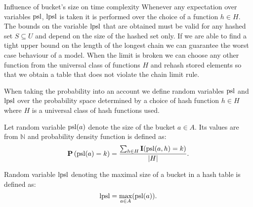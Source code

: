 \begin{section}{Influence of bucket's size on time complexity}
Whenever any expectation over variables $\mathrm{psl}$, $\mathrm{lpsl}$ is taken it is performed over the choice of a function $h \in H$. The bounds on the variable $\mathrm{lpsl}$ that are obtained must be valid for any hashed set $S \subseteq U$ and depend on the size of the hashed set only. If we are able to find a tight upper bound on the length of the longest chain we can guarantee the worst case behaviour of a model. When the limit is broken we can choose any other function from the universal class of functions $H$ and rehash stored elements so that we obtain a table that does not violate the chain limit rule.

When taking the probability into an account we define random variables $\mathrm{psl}$ and $\mathrm{lpsl}$ over the probability space determined by a choice of hash function $h \in H$ where $H$ is a universal class of hash functions used.

\begin{definition}
Let random variable $\mathrm{psl}(a)$ denote the size of the bucket $a \in A$. Its values are from $\mathbb{N}$ and probability density function is defined as:
\[
\mathbf{P}\left(\mathrm{psl}(a) = k\right) = \frac{\sum_{h \in H} \mathbf{I}(\mathrm{psl}(a, h) = k)}{|H|}\text{.}
\]

Random variable $\mathrm{lpsl}$ denoting the maximal size of a bucket in a hash table is defined as:
\[
\mathrm{lpsl} = \displaystyle\max_{a \in A}(\mathrm{psl}(a))\text{.}
\]
\end{definition}
\end{section}

